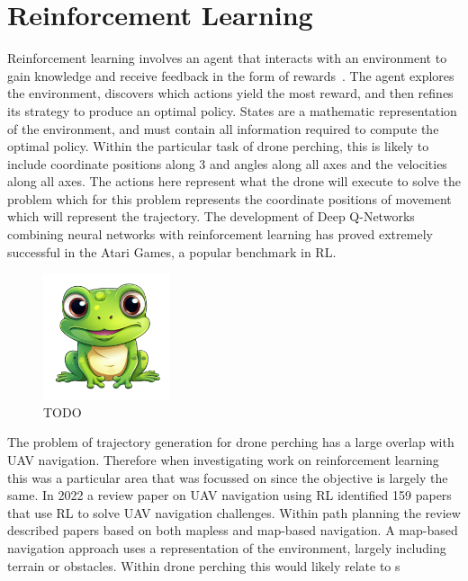 \section{Reinforcement Learning}
Reinforcement learning involves an agent that interacts with an environment to gain knowledge and receive feedback in the form of rewards~\cite{rlIntroSuttonBarlo}.
The agent explores the environment, discovers which actions yield the most reward, and then refines its strategy to produce an optimal policy.
States are a mathematic representation of the environment, and must contain all information required to compute the optimal policy.
Within the particular task of drone perching, this is likely to include coordinate positions along 3 and angles along all axes and the velocities along all axes.
The actions here represent what the drone will execute to solve the problem which for this problem represents the coordinate positions of movement which will represent the trajectory.
The development of Deep Q-Networks combining neural networks with reinforcement learning has proved extremely successful in the Atari Games, a popular benchmark in RL.

\begin{figure}[htbp]
  \centering
  \includegraphics[width=0.33\textwidth]{frog.png}
  \caption{TODO}
\label{fig:rl-intro-drone}
\end{figure}

The problem of trajectory generation for drone perching has a large overlap with UAV navigation.
Therefore when investigating work on reinforcement learning this was a particular area that was focussed on since the objective is largely the same.
In 2022 a review paper\cite{aerialNavReview} on UAV navigation using RL identified 159 papers that use RL to solve UAV navigation challenges.
Within path planning the review described papers based on both mapless and map-based navigation.
A map-based navigation approach uses a representation of the environment, largely including terrain or obstacles.
Within drone perching this would likely relate to s 

